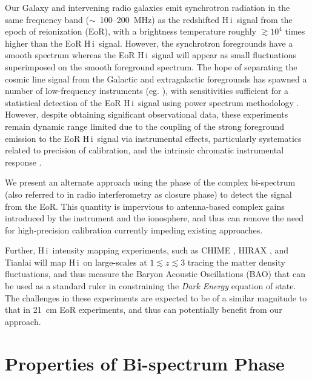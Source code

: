 \documentclass[
reprint,
superscriptaddress,
amsmath,
amssymb,
aps,
prd
]{revtex4-1}
\newcommand{\HI}{H\,{\sc i}}
\begin{document}
Our Galaxy and intervening radio galaxies emit synchrotron radiation in the same frequency band ($\sim$~100--200~MHz) as the redshifted \HI\ signal from the epoch of reionization (EoR), with a brightness temperature roughly $\gtrsim 10^4$ times higher than the EoR \HI\ signal. However, the synchrotron foregrounds have a smooth spectrum whereas the EoR \HI\ signal will appear as small fluctuations superimposed on the smooth foreground spectrum. The hope of separating the cosmic line signal from the Galactic and extragalactic foregrounds has spawned a number of low-frequency instruments (eg. \cite{par10,tin13,van13}), with sensitivities sufficient for a statistical detection of the EoR \HI\ signal using power spectrum methodology \cite{thy13,bea13}.  However, despite obtaining significant observational data, these experiments remain dynamic range limited due to the coupling of the strong foreground emission to the EoR \HI\ signal via instrumental effects, particularly systematics related to precision of calibration, and the intrinsic chromatic instrumental response \cite{thy15a,thy15b,thy16,dat09,dat10,tro16, pac13,ali15,patil17,pob15,liu10,zhe14,barry16,sie17,dil17}. 

We present an alternate approach using the phase of the complex bi-spectrum (also referred to in radio interferometry as closure phase) to detect the signal from the EoR. This quantity is impervious to antenna-based complex gains introduced by the instrument and the ionosphere, and thus can remove the need for high-precision calibration currently impeding existing approaches\cite{car16}. 

Further, \HI\ intensity mapping experiments, such as CHIME \cite{ban14}, HIRAX \cite{new16}, and Tianlai \cite{xu15} will map \HI\ on large-scales at $1\lesssim z \lesssim 3$ tracing the matter density fluctuations, and thus measure the Baryon Acoustic Oscillations (BAO) that can be used as a standard ruler in constraining the {\it Dark Energy} equation of state. The challenges in these experiments are expected to be of a similar magnitude to that in 21~cm EoR experiments, and thus can potentially benefit from our approach.

\section{Properties of Bi-spectrum Phase}\label{sec:CPinfo}
\end{document}
